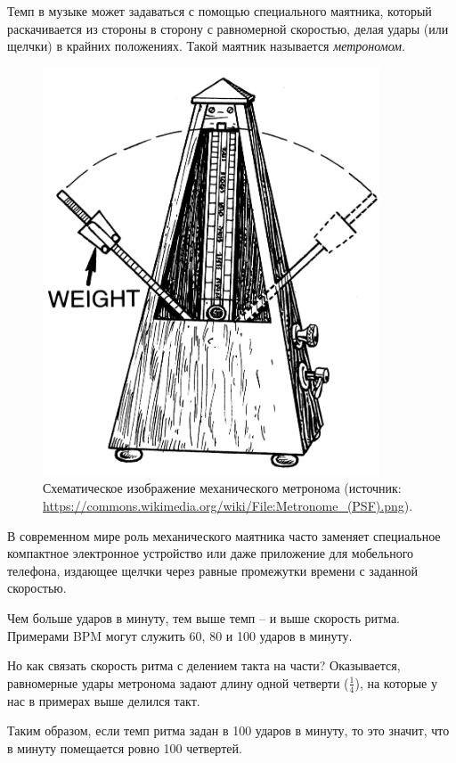 \documentclass[a4paper,twoside]{book}
\begin{document}
Темп в музыке может задаваться с помощью специального маятника, который
раскачивается из стороны в сторону с равномерной скоростью, делая удары (или
щелчки) в крайних положениях. Такой маятник называется \emph{метрономом}.

\begin{figure}[h]
  \caption{Схематическое изображение механического метронома (источник:
    \url{https://commons.wikimedia.org/wiki/File:Metronome_(PSF).png}).}
  \label{fig:sound-metronome}
  \includegraphics[width=10cm]{Metronome}
  \centering
\end{figure}

В современном мире роль механического маятника часто заменяет специальное
компактное электронное устройство или даже приложение для мобельного телефона,
издающее щелчки через равные промежутки времени с заданной скоростью.

Чем больше ударов в минуту, тем выше темп -- и выше скорость ритма. Примерами BPM
могут служить 60, 80 и 100 ударов в минуту.

Но как связать скорость ритма с делением такта на части? Оказывается,
равномерные удары метронома задают длину одной четверти ($\frac{1}{4}$), на
которые у нас в примерах выше делился такт.

Таким образом, если темп ритма задан в 100 ударов в минуту, то это значит, что в
минуту помещается ровно 100 четвертей.

\end{document}
